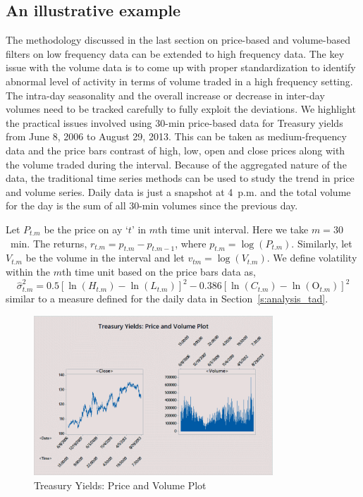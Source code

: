 \subsection{An illustrative example \label{sec:illus_ex}}


The methodology discussed in the last section on price-based and volume-based filters on low frequency data can be extended to high frequency data. The key issue with the volume data is to come up with proper standardization to identify abnormal level of activity in terms of volume traded in a high frequency setting. The intra-day seasonality and the overall increase or decrease in inter-day volumes need to be tracked carefully to fully exploit the deviations. We highlight the practical issues involved using 30-min price-based data for Treasury yields from June 8, 2006 to August 29, 2013. This can be taken as medium-frequency data and the price bars contrast of high, low, open and close prices along with the volume traded during the interval. Because of the aggregated nature of the data, the traditional time series methods can be used to study the trend in price and volume series. Daily data is just a snapshot at 4~p.m. and the total volume for the day is the sum of all 30-min volumes since the previous day.


Let $P_{t. m}$ be the price on ay `$t$' in $m$th time unit interval. Here we take $m=30$~min. The returns, $r_{t. m}= p_{t. m} - p_{t . m-1}$, where $p_{t. m}=\log(P_{t.m})$. Similarly, let $V_{t.m}$ be the volume in the interval and let $v_{tm}= \log(V_{t. m})$. We define volatility within the $m$th time unit based on the price bars data as,
	\begin{equation} \label{eqn:hatsigmasq}
	\hat{\sigma}_{t. m}^2= 0.5 [ \ln(H_{t. m}) - \ln(L_{t.m})]^2 - 0.386[\ln(C_{t.m}) - \ln(\text{O}_{t . m})]^2
	\end{equation}
similar to a measure defined for the daily data in Section~\ref{s:analysis_tad}.

        \begin{figure}[!ht]
        \centering
        \includegraphics[width=0.8\textwidth]{chapters/chapter_stat_ts/figures/treasury.png}
        \caption{Treasury Yields: Price and Volume Plot \label{fig:treasuryyields}}
        \end{figure}
        
